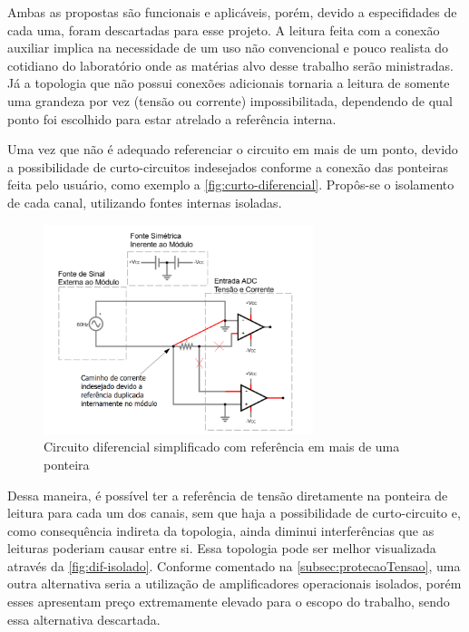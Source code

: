 Ambas as propostas são funcionais e aplicáveis, porém, devido a especifidades de cada uma, foram descartadas para esse projeto. A leitura feita com a conexão auxiliar implica na necessidade de um uso não convencional e pouco realista do cotidiano do laboratório onde as matérias alvo desse trabalho serão ministradas. Já a topologia que não possui conexões adicionais tornaria a leitura de somente uma grandeza por vez (tensão ou corrente) impossibilitada, dependendo de qual ponto foi escolhido para estar atrelado a referência interna.

Uma vez que não é adequado referenciar o circuito em mais de um ponto, devido a possibilidade de curto-circuitos indesejados conforme a conexão das ponteiras feita pelo usuário, como exemplo a \autoref{fig:curto-diferencial}. Propôs-se o isolamento de cada canal, utilizando fontes internas isoladas.

\begin{figure}[htb!]
    \caption{Circuito diferencial simplificado com referência em mais de uma ponteira}
    \label{fig:curto-diferencial}
    \includegraphics[width=0.7\textwidth]{figuras/diferencial-em-curto.png}
    \fonte{}
\end{figure}

Dessa maneira, é possível ter a referência de tensão diretamente na ponteira de leitura para cada um dos canais, sem que haja a possibilidade de curto-circuito e, como consequência indireta da topologia, ainda diminui interferências que as leituras poderiam causar entre si. Essa topologia pode ser melhor visualizada através da \autoref{fig:dif-isolado}.
Conforme comentado na \autoref{subsec:protecaoTensao}, uma outra alternativa seria a utilização de amplificadores operacionais isolados, porém esses apresentam preço extremamente elevado para o escopo do trabalho, sendo essa alternativa descartada.

